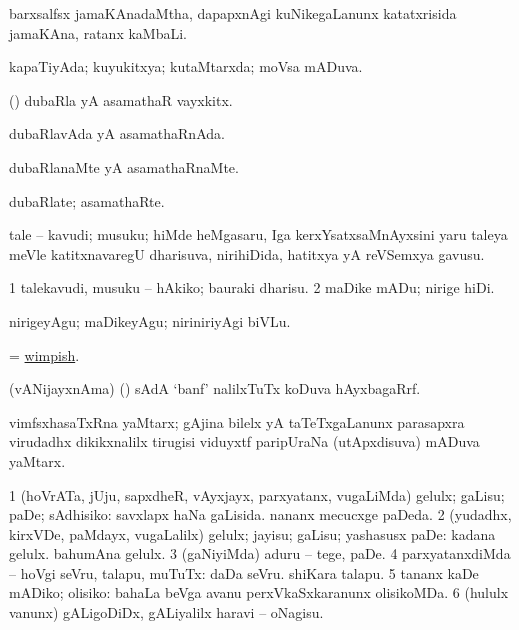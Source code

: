 \bentry
{}
\gl{\nA}
\bmng
barxsalfsx jamaKAnadaMtha, dapapxnAgi kuNikegaLanunx katatxrisida jamaKAna, ratanx kaMbaLi. 
\emng
\eentry

\bentry
{}
\gl{\saMkiSx}
\bmng
{} 
\emng
\eentry

\bentry
{}
\gl{\gu} 
\bmng
kapaTiyAda; kuyukitxya; kutaMtarxda; moVsa mADuva. 
\emng
\eentry

\bentry
{}
\gl{\nA}
\bmng
(\AmA) dubaRla yA asamathaR vayxkitx. 
\emng
\eentry

\bentry
{}
\gl{\gu}
\bmng
dubaRlavAda yA asamathaRnAda. 
\emng
\eentry

\bentry
{}
\gl{\kirxvi}
\bmng
dubaRlanaMte yA asamathaRnaMte. 
\emng
\eentry

\bentry
{}
\gl{\nA}
\bmng
dubaRlate; asamathaRte. 
\emng
\eentry

\bentry
{} 
\gl{\nA}
\expl{}
\bmng
tale -- kavudi; musuku; hiMde heMgasaru, Iga kerxYsatxsaMnAyxsini yaru taleya meVle katitxnavaregU dharisuva, nirihiDida, hatitxya yA reVSemxya gavusu. 
\emng
\eentry

\bentry
{} 
\gl{\sakirx}
\expl{}
\bmng
\bnum
\num{1} talekavudi, musuku -- hAkiko; bauraki dharisu. 
\num{2} maDike mADu; nirige hiDi. 
\enum
\emng

\noindent 
\gl{\akirx}
\expl{}
\bmng
nirigeyAgu; maDikeyAgu; niriniriyAgi biVLu. 
\emng
\eentry

\bentry
{} 
\gl{\gu}
\expl{}
\bmng
= \hyperlink{wimpish}{wimpish}. 
\emng
\eentry

\bentry
{} 
\gl{\nA}
\bmng
(vANijayxnAma) (\AmA) sAdA `banf' nalilxTuTx koDuva hAyxbagaRrf. 
\emng
\eentry

\bentry
{} 
\gl{\nA}
\bmng
vimfsxhasaTxRna yaMtarx; gAjina bilelx yA taTeTxgaLanunx parasapxra virudadhx dikikxnalilx tirugisi viduyxtf paripUraNa (utApxdisuva) mADuva yaMtarx. 
\emng
\eentry

\bentry
{} 
\gl{\sakirx}
\expl{}
\bmng
\bnum
\num{1} (hoVrATa, jUju, sapxdheR, vAyxjayx, parxyatanx, \mo vugaLiMda) gelulx; gaLisu; paDe; sAdhisiko:  savxlapx haNa gaLisida.  nananx mecucxge paDeda. 
\num{2} (yudadhx, kirxVDe, paMdayx, \mo vugaLalilx) gelulx; jayisu; gaLisu; yashasusx paDe:  kadana gelulx.  bahumAna gelulx. 
\num{3} (gaNiyiMda) aduru -- tege, paDe. 
\num{4} parxyatanxdiMda -- hoVgi seVru, talapu, muTuTx:  daDa seVru.  shiKara talapu. 
\num{5} tananx kaDe mADiko; olisiko:  bahaLa beVga avanu perxVkaSxkaranunx olisikoMDa. 
\num{6} (hululx \mo vanunx) gALigoDiDx, gALiyalilx haravi -- oNagisu. 
\enum
\emng

